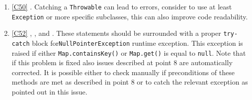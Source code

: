 \begin{enumerate}
	\item \ref{C50} . Catching a \texttt{Throwable} can lead to errors, consider to use at least \texttt{Exception} or more specific subclasses, this can also improve code readability.  
	\item \ref{C52} , ,  and . These statements should be surrounded with a proper \texttt{try-catch} block for\texttt{NullPointerException} runtime exception. This exception is raised if either \texttt{Map.containsKey()} or \texttt{Map.get()} is equal to \texttt{null}. Note that if this problem is fixed also issues described at point 8 are automatically corrected. It is possible either to check manually if preconditions of these methods are met as described in point 8 or to catch the relevant exception as pointed out in this issue.
\end{enumerate}

